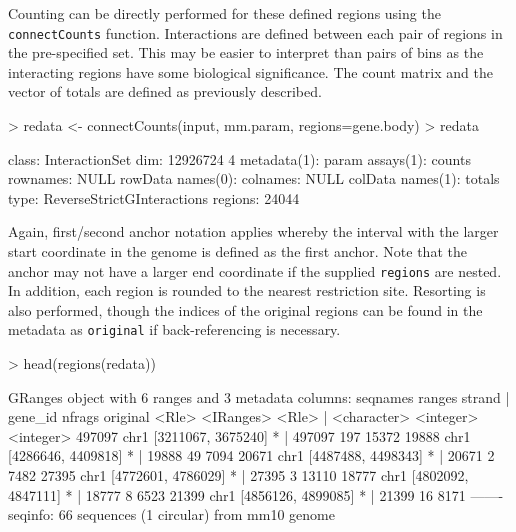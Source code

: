 \documentclass[12pt]{report}
\renewenvironment{Schunk}{\vspace{0pt}}{\vspace{0pt}}
\newcommand{\code}[1]{{\small\texttt{#1}}}
\begin{document}
Counting can be directly performed for these defined regions using the \code{connectCounts} function.
Interactions are defined between each pair of regions in the pre-specified set.
This may be easier to interpret than pairs of bins as the interacting regions have some biological significance.
The count matrix and the vector of totals are defined as previously described.

\begin{Schunk}
\begin{Sinput}
> redata <- connectCounts(input, mm.param, regions=gene.body)
> redata
\end{Sinput}
\begin{Soutput}
class: InteractionSet 
dim: 12926724 4 
metadata(1): param
assays(1): counts
rownames: NULL
rowData names(0):
colnames: NULL
colData names(1): totals
type: ReverseStrictGInteractions
regions: 24044
\end{Soutput}
\end{Schunk}

Again, first/second anchor notation applies whereby the interval with the larger start coordinate in the genome is defined as the first anchor.
Note that the anchor may not have a larger end coordinate if the supplied \code{regions} are nested.
In addition, each region is rounded to the nearest restriction site.
Resorting is also performed, though the indices of the original regions can be found in the metadata as \code{original} if back-referencing is necessary.

\begin{Schunk}
\begin{Sinput}
> head(regions(redata))
\end{Sinput}
\begin{Soutput}
GRanges object with 6 ranges and 3 metadata columns:
         seqnames             ranges strand |     gene_id    nfrags  original
            <Rle>          <IRanges>  <Rle> | <character> <integer> <integer>
  497097     chr1 [3211067, 3675240]      * |      497097       197     15372
   19888     chr1 [4286646, 4409818]      * |       19888        49      7094
   20671     chr1 [4487488, 4498343]      * |       20671         2      7482
   27395     chr1 [4772601, 4786029]      * |       27395         3     13110
   18777     chr1 [4802092, 4847111]      * |       18777         8      6523
   21399     chr1 [4856126, 4899085]      * |       21399        16      8171
  -------
  seqinfo: 66 sequences (1 circular) from mm10 genome
\end{Soutput}
\end{Schunk}
\end{document}
